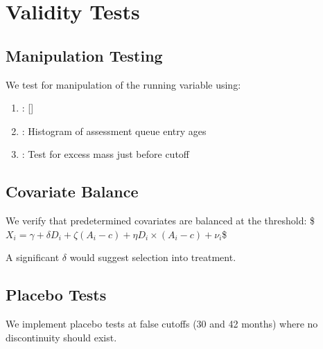 \documentclass[letterpaper,10pt,english]{jupyterBook}
\begin{document}
\section{Validity Tests}
\label{\detokenize{methodology:validity-tests}}

\subsection{Manipulation Testing}
\label{\detokenize{methodology:manipulation-testing}}
\sphinxAtStartPar
We test for manipulation of the running variable using:
\begin{enumerate}
%
\item {} 
\sphinxAtStartPar
{}: {[}{]}

\item {} 
\sphinxAtStartPar
{}: Histogram of assessment queue entry ages

\item {} 
\sphinxAtStartPar
{}: Test for excess mass just before cutoff

\end{enumerate}


\subsection{Covariate Balance}
\label{\detokenize{methodology:covariate-balance}}
\sphinxAtStartPar
We verify that predetermined covariates are balanced at the threshold:
\$\(X_i = \gamma + \delta D_i + \zeta (A_i - c) + \eta D_i \times (A_i - c) + \nu_i\)\$

\sphinxAtStartPar
A significant \(\delta\) would suggest selection into treatment.


\subsection{Placebo Tests}
\label{\detokenize{methodology:placebo-tests}}
\sphinxAtStartPar
We implement placebo tests at false cutoffs (30 and 42 months) where no discontinuity should exist.
\end{document}
